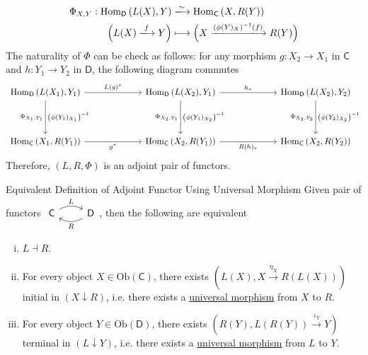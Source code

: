 \begin{prf}
    \begin{align*}
        \Phi_{X,Y}:\mathrm{Hom}_{\mathsf{D}}\left(L(X),Y\right)&\xlongrightarrow{\sim} \mathrm{Hom}_{\mathsf{C}}\left(X,R(Y)\right)\\
        \Big(L(X)\xlongrightarrow{f}Y\Big)&\longmapsto \Big(X\xlongrightarrow{\left(\phi(Y)_X\right)^{-1}(f)}R(Y)\Big)
    \end{align*}
    The naturality of $\Phi$ can be check as follows: for any morphism $g:X_2\to X_1$ in $\mathsf{C}$ and $h:Y_1\to Y_2$ in $\mathsf{D}$, the following diagram commutes
    \[
        \begin{tikzcd}[ampersand replacement=\&]
            \mathrm{Hom}_{\mathsf{D}}\left(L(X_1),Y_1\right) \arrow[r, "L(g)^*"] \arrow[d, "\Phi_{X_1,Y_1}"', "\left(\phi(Y_1)_{X_1}\right)^{-1}"] \&[+40pt]\mathrm{Hom}_{\mathsf{D}}\left(L(X_2),Y_1\right) \arrow[r, "{h_*}"]\arrow[d, "\Phi_{X_2,Y_1}"', "\left(\phi(Y_1)_{X_2}\right)^{-1}"] \&[+40pt] \mathrm{Hom}_{\mathsf{D}}\left(L(X_2),Y_2\right) \arrow[d, "\Phi_{X_2,Y_2}"', "\left(\phi(Y_2)_{X_2}\right)^{-1}"] \\[+20pt]
            \mathrm{Hom}_{\mathsf{C}}\left(X_1,R(Y_1)\right) \arrow[r, "{g^*}"'] \&\mathrm{Hom}_{\mathsf{C}}\left(X_2,R(Y_1)\right) \arrow[r, "{R(h)_*}"']\& \mathrm{Hom}_{\mathsf{C}}\left(X_2,R(Y_2)\right)
        \end{tikzcd}
    \]
    Therefore, $(L,R,\Phi)$ is an adjoint pair of functors.
\end{prf}


\begin{corollary}{Equivalent Definition of Adjoint Functor Using Universal Morphism}{}
    Given pair of functors $\begin{tikzcd}[ampersand replacement=\&]
        \mathsf{C} \arrow[r, "L", bend left] \& \mathsf{D} \arrow[l, "R", bend left]
        \end{tikzcd}$, then the following are equivalent
    \begin{enumerate}[(i)]
        \item $L \dashv R$.
        \item For every object $X\in\mathrm{Ob}(\mathsf{C})$, there exists $\left(L(X), X\xrightarrow{\eta_X} R(L(X))\right)$ initial in $\left(X\downarrow R\right)$, i.e. there exists a \hyperref[th:universal_morphism]{universal morphism} from $X$ to $R$.
        \item For every object $Y\in\mathrm{Ob}(\mathsf{D})$, there exists $\left(R(Y), L(R(Y))\xrightarrow{\varepsilon_Y} Y\right)$ terminal in $\left(L\downarrow Y\right)$, i.e. there exists a \hyperref[th:universal_morphism]{universal morphism} from $L$ to $Y$.
    \end{enumerate} 
\end{corollary}

